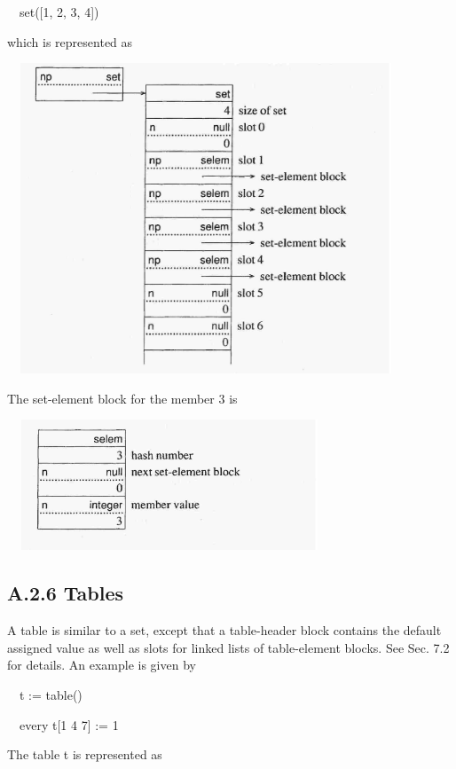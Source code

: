 {\ttfamily\mdseries
\ \ set([1, 2, 3, 4])}

\noindent which is represented as


\ \  \includegraphics[width=4.3811in,height=3.6465in]{ib-img/ib-img119.jpg} 


The set-element block for the member 3 is


\ \  \includegraphics[width=3.5272in,height=1.5319in]{ib-img/ib-img120.jpg} 

\subsection{A.2.6 Tables}

A table is similar to a set, except that a table-header block contains
the default assigned value as well as slots for linked lists of
table-element blocks. See Sec. 7.2 for details. An example is given by

{\ttfamily\mdseries
\ \ t := table()}

{\ttfamily\mdseries
\ \ every t[1 {\textbar} 4 {\textbar} 7] := 1}


The table t is represented as



